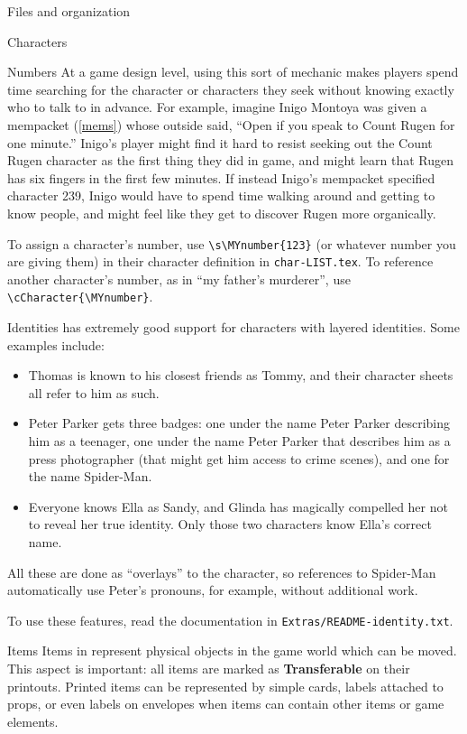 \documentclass[sheet]{GameTexBase}
\begin{document}
\begin{section}{Files and organization}
\begin{subsection}{Characters}
\begin{subsubsection}{Numbers}
At a game design level, using this sort of mechanic makes players spend time searching for the character or characters they seek without knowing exactly who to talk to in advance.  For example, imagine Inigo Montoya was given a
mempacket (\ref{mems}) whose outside said, ``Open if you speak to Count Rugen for one minute.''  Inigo's player might find it hard to resist seeking out the Count Rugen character as the first thing they did in game, and might learn that Rugen has six fingers in the first few minutes.  If instead Inigo's mempacket specified character 239, Inigo would have to spend time walking around and getting to know people, and might feel like they get to discover Rugen more organically.

To assign a character's number, use \lstinline|\s\MYnumber{123}| (or whatever number you are giving them) in their character definition in \lstinline|char-LIST.tex|.
To reference another character's number, as in ``my father's murderer'', use \lstinline|\cCharacter{\MYnumber}|.
\end{subsubsection}
\begin{subsubsection}{Identities}
\label{identities}
\gametex{} has extremely good support for characters with layered identities.  Some examples include:
\begin{itemize}
\item Thomas is known to his closest friends as Tommy, and their character sheets all refer to him as such.
\item Peter Parker gets three badges: one under the name Peter Parker describing him as a teenager, one under the name Peter Parker that describes him as a press photographer (that might get him access to crime scenes), and one for the name Spider-Man.
\item Everyone knows Ella as Sandy, and Glinda has magically compelled her not to reveal her true identity.  Only those two characters know Ella's correct name.
\end{itemize}
All these are done as ``overlays'' to the character, so references to Spider-Man automatically use Peter's pronouns, for example, without additional work.

To use these features, read the documentation in \lstinline|Extras/README-identity.txt|.
\end{subsubsection}
\end{subsection}
\begin{subsection}{Items}
Items in \gametex{} represent physical objects in the game world which can be moved.  This aspect is important: all items are marked as \textbf{Transferable} on their printouts.
Printed \gametex{} items can be represented by simple cards, labels attached to props, or even labels on envelopes when items can contain other items or game elements.


\end{subsection}
\end{section}
\end{document}
